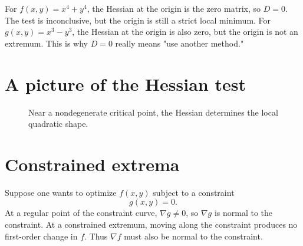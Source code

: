 \begin{example}
For \(f(x,y)=x^4+y^4\), the Hessian at the origin is the zero matrix, so \(D=0\).  The test is inconclusive, but the origin is still a strict local minimum.  For \(g(x,y)=x^3-y^3\), the Hessian at the origin is also zero, but the origin is not an extremum.  This is why \(D=0\) really means "use another method."
\end{example}

\section{A picture of the Hessian test}

\begin{figure}[H]
\centering
{}
\caption{Near a nondegenerate critical point, the Hessian determines the local quadratic shape.}
\end{figure}

\section{Constrained extrema}

Suppose one wants to optimize \(f(x,y)\) subject to a constraint
\[
  g(x,y)=0.
\]
At a regular point of the constraint curve, \(\nabla g\ne0\), so \(\nabla g\) is normal to the constraint.  At a constrained extremum, moving along the constraint produces no first-order change in \(f\).  Thus \(\nabla f\) must also be normal to the constraint.

